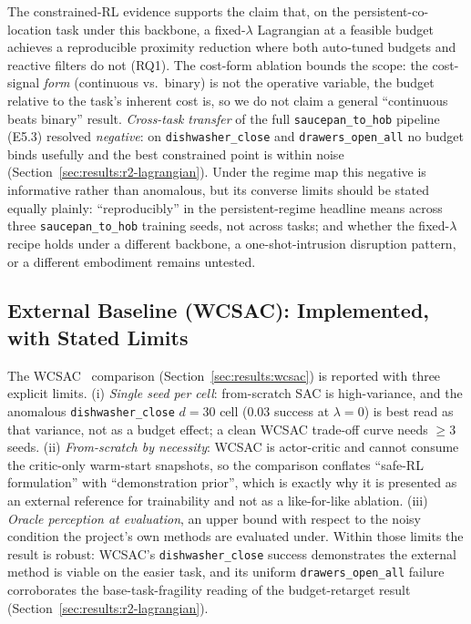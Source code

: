 \documentclass[11pt,a4paper]{report}
\begin{document}
The constrained-RL evidence supports the claim that, on the
persistent-co-location task under this backbone, a fixed-$\lambda$
Lagrangian at a feasible budget achieves a reproducible proximity
reduction where both auto-tuned budgets and reactive filters do not
(RQ1). The cost-form ablation bounds the scope: the cost-signal
\emph{form} (continuous vs.\ binary) is not the operative variable,
the budget relative to the task's inherent cost is, so we do not
claim a general ``continuous beats binary'' result. \emph{Cross-task
transfer} of the full \texttt{saucepan\_to\_hob} pipeline (E5.3) resolved
\emph{negative}: on \texttt{dishwasher\_close} and
\texttt{drawers\_open\_all} no budget binds usefully and the best
constrained point is within noise
(Section~\ref{sec:results:r2-lagrangian}). Under the regime map this
negative is informative rather than anomalous, but its converse
limits should be stated equally plainly: ``reproducibly'' in the
persistent-regime headline means across three \texttt{saucepan\_to\_hob} training
seeds, not across
tasks; and whether the fixed-$\lambda$ recipe holds under a
different backbone, a one-shot-intrusion disruption pattern, or a
different embodiment remains untested.

\subsection{External Baseline (WCSAC): Implemented, with Stated Limits}
\label{sec:disc:wcsac-honest}

The WCSAC~\cite{yang2021wcsac} comparison
(Section~\ref{sec:results:wcsac}) is reported with three explicit
limits. (i) \emph{Single seed per cell}: from-scratch SAC is
high-variance, and the anomalous \texttt{dishwasher\_close} $d{=}30$ cell ($0.03$
success at $\lambda = 0$) is best read as that variance, not as a
budget effect; a clean WCSAC trade-off curve needs $\geq 3$ seeds.
(ii) \emph{From-scratch by necessity}: WCSAC is actor-critic and
cannot consume the critic-only warm-start snapshots, so the
comparison conflates ``safe-RL formulation'' with ``demonstration
prior'', which is exactly why it is presented as an external
reference for trainability and not as a like-for-like ablation.
(iii) \emph{Oracle perception at evaluation}, an upper bound with
respect to the noisy condition the project's own methods are
evaluated under. Within those limits the result is robust:
WCSAC's \texttt{dishwasher\_close} success demonstrates the external method is
viable on the easier task, and its uniform \texttt{drawers\_open\_all} failure
corroborates the base-task-fragility reading of the budget-retarget
result (Section~\ref{sec:results:r2-lagrangian}).
\end{document}

